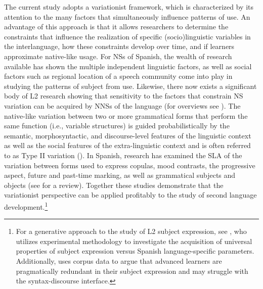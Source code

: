 \documentclass[output=paper]{langscibook}
\begin{document}
The current study adopts a variationist framework, which is characterized by its attention to the many factors that simultaneously influence patterns of use. An advantage of this approach is that it allows researchers to determine the constraints that influence the realization of specific (socio)linguistic variables in the interlanguage, how these constraints develop over time, and if learners approximate native-like usage. For NSs of Spanish, the wealth of research available has shown the multiple independent linguistic factors, as well as social factors such as regional location of a speech community come into play in studying the patterns of subject from use. Likewise, there now exists a significant body of L2 research showing that sensitivity to the factors that constrain NS variation can be acquired by NNSs of the language (for overviews see \citealt{Geeslin2014, Kanwit2018}). The native-like variation between two or more grammatical forms that perform the same function (i.e., variable structures) is guided probabilistically by the semantic, morphosyntactic, and discourse-level features of the linguistic context as well as the social features of the extra-linguistic context and is often referred to as Type II variation (\citealt{BayleyPreston1996, MougeonDewaele2004, Young1991}).  In Spanish, research has examined the SLA of the variation between forms used to express copulas, mood contrasts, the progressive aspect, future and past-time marking, as well as grammatical subjects and objects (see \citealt{Geeslin2018} for a review). Together these studies demonstrate that the variationist perspective can be applied profitably to the study of second language development.\footnote{For a generative approach to the study of L2 subject expression, see \citet{Lozano2002}, who utilizes experimental methodology to investigate the acquisition of universal properties of subject expression versus Spanish language-specific parameters. Additionally, \citet{Lozano2016} uses corpus data to argue that advanced learners are pragmatically redundant in their subject expression and may struggle with the syntax-discourse interface.}
\end{document}
